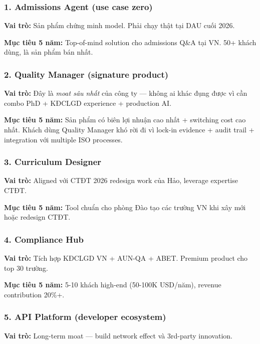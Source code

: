 \documentclass[11pt,a4paper]{article}
\begin{document}
\subsubsection*{1. Admissions Agent (use case zero)}

\textbf{Vai trò:} Sản phẩm chứng minh model. Phải chạy thật tại DAU cuối 2026.

\textbf{Mục tiêu 5 năm:} Top-of-mind solution cho admissions Q\&A tại VN. 50+
khách dùng, là sản phẩm bán nhất.

\subsubsection*{2. Quality Manager (signature product)}

\textbf{Vai trò:} Đây là \textit{moat sâu nhất} của công ty --- không ai khác
đụng được vì cần combo PhD + KĐCLGD experience + production AI.

\textbf{Mục tiêu 5 năm:} Sản phẩm có biên lợi nhuận cao nhất + switching cost
cao nhất. Khách dùng Quality Manager khó rời đi vì lock-in evidence + audit
trail + integration với multiple ISO processes.

\subsubsection*{3. Curriculum Designer}

\textbf{Vai trò:} Aligned với CTĐT 2026 redesign work của Hảo, leverage
expertise CTĐT.

\textbf{Mục tiêu 5 năm:} Tool chuẩn cho phòng Đào tạo các trường VN khi xây mới
hoặc redesign CTĐT.

\subsubsection*{4. Compliance Hub}

\textbf{Vai trò:} Tích hợp KĐCLGD VN + AUN-QA + ABET. Premium product cho top 30 trường.

\textbf{Mục tiêu 5 năm:} 5-10 khách high-end (50-100K USD/năm), revenue contribution 20\%+.

\subsubsection*{5. API Platform (developer ecosystem)}

\textbf{Vai trò:} Long-term moat --- build network effect và 3rd-party innovation.
\end{document}
